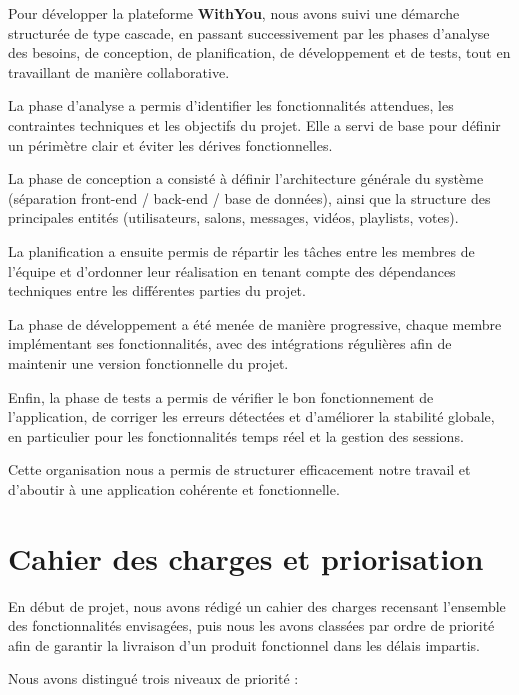 \documentclass[12pt,a4paper]{report}
\begin{document}
Pour développer la plateforme \textbf{WithYou}, nous avons suivi une démarche structurée de type cascade, en passant successivement par les phases d’analyse des besoins, de conception, de planification, de développement et de tests, tout en travaillant de manière collaborative.

La phase d’analyse a permis d’identifier les fonctionnalités attendues, les contraintes techniques et les objectifs du projet. Elle a servi de base pour définir un périmètre clair et éviter les dérives fonctionnelles.

La phase de conception a consisté à définir l’architecture générale du système (séparation front-end / back-end / base de données), ainsi que la structure des principales entités (utilisateurs, salons, messages, vidéos, playlists, votes).

La planification a ensuite permis de répartir les tâches entre les membres de l’équipe et d’ordonner leur réalisation en tenant compte des dépendances techniques entre les différentes parties du projet.

La phase de développement a été menée de manière progressive, chaque membre implémentant ses fonctionnalités, avec des intégrations régulières afin de maintenir une version fonctionnelle du projet.

Enfin, la phase de tests a permis de vérifier le bon fonctionnement de l’application, de corriger les erreurs détectées et d’améliorer la stabilité globale, en particulier pour les fonctionnalités temps réel et la gestion des sessions.

Cette organisation nous a permis de structurer efficacement notre travail et d’aboutir à une application cohérente et fonctionnelle.

\section{Cahier des charges et priorisation}

En début de projet, nous avons rédigé un cahier des charges recensant l’ensemble des fonctionnalités envisagées, puis nous les avons classées par ordre de priorité afin de garantir la livraison d’un produit fonctionnel dans les délais impartis.

Nous avons distingué trois niveaux de priorité :
\end{document}
